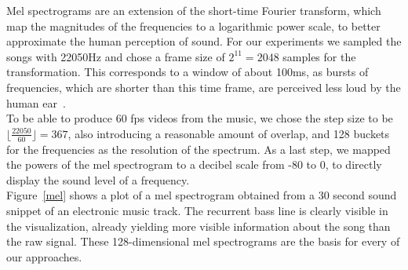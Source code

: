     \indent Mel spectrograms are an extension of the short-time Fourier transform, which map the magnitudes of the frequencies to a logarithmic power scale, to better approximate the human perception of sound.
    For our experiments we sampled the songs with 22050Hz and chose a frame size of $2^{11}=2048$ samples for the transformation.
    This corresponds to a window of about 100ms, as bursts of frequencies, which are shorter than this time frame, are perceived less loud by the human ear~\cite{Acoustics}.\\
    To be able to produce 60 fps videos from the music, we chose the step size to be $\lfloor \frac{22050}{60} \rfloor = 367$, also introducing a reasonable amount of overlap, and 128 buckets for the frequencies as the resolution of the spectrum.
    As a last step, we mapped the powers of the mel spectrogram to a decibel scale from -80 to 0, to directly display the sound level of a frequency.\\ 
    \indent Figure~\ref{mel} shows a plot of a mel spectrogram obtained from a 30 second sound snippet of an electronic music track. 
    The recurrent bass line is clearly visible in the visualization, already yielding more visible information about the song than the raw signal.
    These 128-dimensional mel spectrograms are the basis for every of our approaches.

